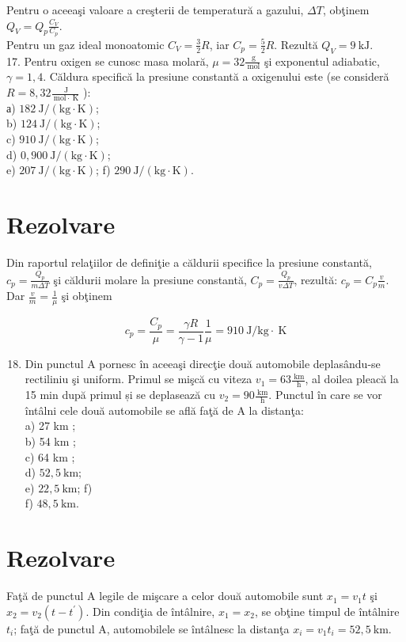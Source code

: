 Pentru o aceeaşi valoare a creşterii de temperatură a gazului, $\Delta T$, obţinem $Q_{V}=Q_{p} \frac{C_{V}}{C_{p}}$.\\
Pentru un gaz ideal monoatomic $C_{V}=\frac{3}{2} R$, iar $C_{p}=\frac{5}{2} R$. Rezultă $Q_{V}=9 \mathrm{~kJ}$.\\
17. Pentru oxigen se cunosc masa molară, $\mu=32 \frac{\mathrm{~g}}{\mathrm{~mol}}$ şi exponentul adiabatic, $\gamma=1,4$. Căldura specifică la presiune constantă a oxigenului este (se consideră $R=8,32 \frac{\mathrm{~J}}{\mathrm{~mol} \cdot \mathrm{~K}}$ ):\\
а) $182 \mathrm{~J} /(\mathrm{kg} \cdot \mathrm{K})$;\\
b) $124 \mathrm{~J} /(\mathrm{kg} \cdot \mathrm{K})$;\\
c) $910 \mathrm{~J} /(\mathrm{kg} \cdot \mathrm{K})$;\\
d) $0,900 \mathrm{~J} /(\mathrm{kg} \cdot \mathrm{K})$;\\
e) $207 \mathrm{~J} /(\mathrm{kg} \cdot \mathrm{K})$; f) $290 \mathrm{~J} /(\mathrm{kg} \cdot \mathrm{K})$.

\section*{Rezolvare}
Din raportul relaţiilor de definiţie a căldurii specifice la presiune constantă, $c_{p}=\frac{Q_{p}}{m \Delta T}$ şi căldurii molare la presiune constantă, $C_{p}=\frac{Q_{p}}{v \Delta T}$, rezultă: $c_{p}=C_{p} \frac{v}{m}$. Dar $\frac{v}{m}=\frac{1}{\mu}$ şi obţinem

$$
c_{p}=\frac{C_{p}}{\mu}=\frac{\gamma R}{\gamma-1} \frac{1}{\mu}=910 \mathrm{~J} / \mathrm{kg} \cdot \mathrm{~K}
$$

\begin{enumerate}
  \setcounter{enumi}{17}
  \item Din punctul A pornesc în aceeaşi direcţie două automobile deplasându-se rectiliniu şi uniform. Primul se mişcă cu viteza $v_{1}=63 \frac{\mathrm{~km}}{\mathrm{~h}}$, al doilea pleacă la 15 min după primul și se deplasează cu $v_{2}=90 \frac{\mathrm{~km}}{\mathrm{~h}}$. Punctul în care se vor întâlni cele două automobile se află faţă de A la distanţa:\\
a) 27 km ;\\
b) 54 km ;\\
c) 64 km ;\\
d) $52,5 \mathrm{~km}$;\\
e) $22,5 \mathrm{~km}$; f)\\
f) $48,5 \mathrm{~km}$.
\end{enumerate}

\section*{Rezolvare}
Faţă de punctul A legile de mişcare a celor două automobile sunt $x_{1}=v_{1} t$ şi $x_{2}=v_{2}\left(t-t^{\prime}\right)$. Din condiţia de întâlnire, $x_{1}=x_{2}$, se obţine timpul de întâlnire $t_{i}$; faţă de punctul A, automobilele se întâlnesc la distanţa $x_{i}=v_{1} t_{i}=52,5 \mathrm{~km}$.

